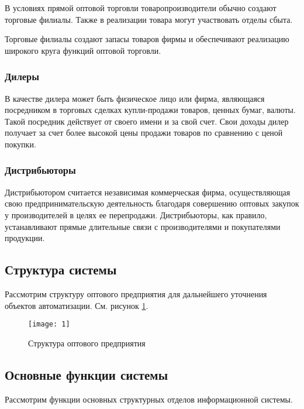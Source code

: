 \documentclass[a4paper,14pt]{extarticle}
\begin{document}
В условиях прямой оптовой торговли товаропроизводители обычно создают торговые филиалы. Также в реализации товара могут участвовать отделы сбыта.

Торговые филиалы создают запасы товаров фирмы и обеспечивают реализацию широкого круга функций оптовой торговли.

\subsubsection{Дилеры}
В качестве дилера может быть физическое лицо или фирма, являющаяся посредником в торговых сделках купли-продажи товаров, ценных бумаг, валюты. Такой посредник действует от своего имени и за свой счет. Свои доходы дилер получает за счет более высокой цены продажи товаров по сравнению с ценой покупки.

\subsubsection{Дистрибьюторы}
Дистрибьютором считается независимая коммерческая фирма, осуществляющая свою предпринимательскую деятельность благодаря совершению оптовых закупок у производителей в целях ее перепродажи. Дистрибьюторы, как правило, устанавливают прямые длительные связи с производителями и покупателями продукции.

\subsection{Структура системы}
Рассмотрим структуру оптового предприятия для дальнейшего уточнения объектов автоматизации. См. рисунок \ref{img:struct}.

\begin{figure}[h!]
	\centering
	\texttt{[image: 1]}
	\caption{Структура оптового предприятия}
	\label{img:struct}
\end{figure}
\newpage
\subsection{Основные функции системы}
Рассмотрим функции основных структурных отделов информационной системы.
\small
\end{document}
